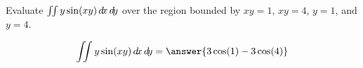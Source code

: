 \documentclass{ximera}
\author{David Guichard \and Neal Koblitz \and H. Jerome Keisler \and Albert Scheller \and Barry Balof \and Mike Wills \and Matthew Carr}
\begin{document}
\begin{exercise}




Evaluate $\iint y\sin(xy) \mathop{}\!d\! x \mathop{}\!d\! y$ over the region bounded by $xy=1$, $xy=4$, $y=1$, and $y=4$.

\begin{prompt}
\[
\iint y\sin(xy)  \d x \d y=\answer{3\cos(1)-3\cos(4)}
\]
\end{prompt}



\end{exercise}
\end{document}
